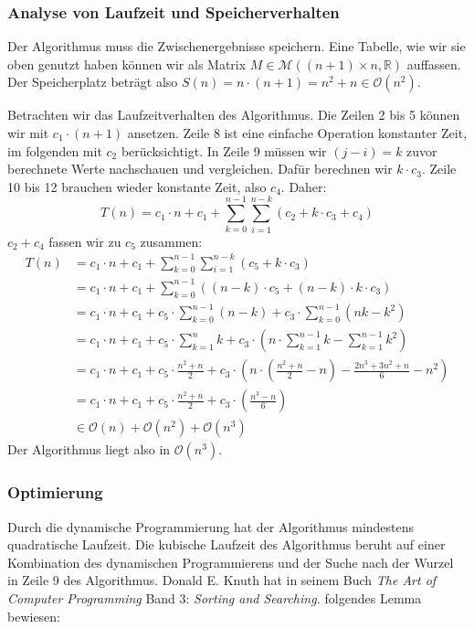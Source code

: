 \subsubsection{Analyse von Laufzeit und Speicherverhalten}
Der Algorithmus muss die Zwischenergebnisse speichern. Eine Tabelle, wie wir sie oben genutzt haben können wir als Matrix $M \in \mathcal{M}((n + 1) \times n, \mathbb{R})$ auffassen. Der Speicherplatz beträgt also $S(n) = n \cdot (n+1) = n^2 + n \in \mathcal{O}(n^2)$.

Betrachten wir das Laufzeitverhalten des Algorithmus. Die Zeilen 2 bis 5 können wir mit $c_1 \cdot (n+1)$ ansetzen. Zeile 8 ist eine einfache Operation konstanter Zeit, im folgenden mit $c_2$ berücksichtigt. In Zeile 9 müssen wir $(j-i) = k$ zuvor berechnete Werte nachschauen und vergleichen. Dafür berechnen wir $k \cdot c_3$. Zeile 10 bis 12 brauchen wieder konstante Zeit, also $c_4$. Daher:
\[ T(n) = c_1 \cdot n + c_1 + \sum_{k=0}^{n-1} \sum_{i=1}^{n-k} \left( c_2 + k \cdot c_3 + c_4\right) \]
$c_2 + c_4$ fassen wir zu $c_5$ zusammen:
\begin{align*}
  T(n) &= c_1 \cdot n + c_1 + \sum_{k=0}^{n-1} \sum_{i=1}^{n-k} \left( c_5 + k \cdot c_3 \right)\\
       &= c_1 \cdot n + c_1 + \sum_{k=0}^{n-1} \left( (n-k) \cdot c_5 + (n-k) \cdot k \cdot c_3 \right)\\
       &= c_1 \cdot n + c_1 + c_5 \cdot \sum_{k=0}^{n-1} (n-k) + c_3 \cdot \sum_{k=0}^{n-1} (nk - k^2)\\
       &= c_1 \cdot n + c_1 + c_5 \cdot \sum_{k=1}^{n} k + c_3 \cdot \left( n \cdot \sum_{k=1}^{n-1} k - \sum_{k=1}^{n-1} k^2\right)\\
       &= c_1 \cdot n + c_1 + c_5 \cdot \frac{n^2 + n}{2} + c_3 \cdot \left( n \cdot \left( \frac{n^2 + n}{2} -n \right) - \frac{2n^3 + 3n^2 + n}{6} -n^2 \right)\\
       &= c_1 \cdot n + c_1 + c_5 \cdot \frac{n^2 + n}{2} + c_3 \cdot \left( \frac{n^3 - n}{6} \right)\\
       &\in \mathcal{O}(n) + \mathcal{O}(n^2) + \mathcal{O}(n^3)
\end{align*}
Der Algorithmus liegt also in $\mathcal{O}(n^3)$.

\subsubsection{Optimierung}
Durch die dynamische Programmierung hat der Algorithmus mindestens quadratische Laufzeit. Die kubische Laufzeit des Algorithmus beruht auf einer Kombination des dynamischen Programmierens und der Suche nach der Wurzel in Zeile 9 des Algorithmus. Donald E. Knuth hat in seinem Buch \textit{The Art of Computer Programming} Band 3: \textit{Sorting and Searching.} folgendes Lemma bewiesen:

